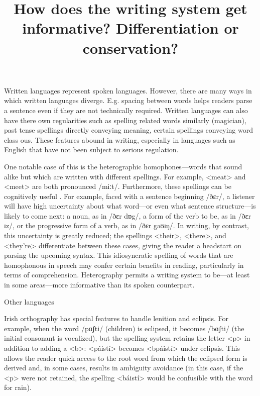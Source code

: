 \documentclass[doc,biblatex]{apa7}
\title{How does the writing system get informative? Differentiation or conservation?}
\begin{document}
\maketitle

\noindent
Written languages represent spoken languages. However, there are many ways in which written languages diverge. E.g. spacing between words helps readers parse a sentence even if they are not technically required. Written languages can also have there own regularities such as spelling related words similarly (magician), past tense spellings directly conveying meaning, certain spellings conveying word class ous. These features abound in writing, especially in languages such as English that have not been subject to serious regulation.

One notable case of this is the heterographic homophones---words that sound alike but which are written with different spellings. For example, <meat> and <meet> are both pronounced /miːt/. Furthermore, these spellings can be cognitively useful . For example, faced with a sentence beginning /ðɛr/, a listener will have high uncertainty about what word---or even what sentence structure---is likely to come next: a noun, as in /ðɛr dɒg/, a form of the verb to be, as in /ðɛr ɪz/, or the progressive form of a verb, as in /ðɛr gəʊɪŋ/. In writing, by contrast, this uncertainty is greatly reduced; the spellings <their>, <there>, and <they're> differentiate between these cases, giving the reader a headstart on parsing the upcoming syntax. This idiosyncratic spelling of words that are homophonous in speech may confer certain benefits in reading, particularly in terms of comprehension. Heterography permits a writing system to be---at least in some areas---more informative than its spoken counterpart.

Other languages

Irish orthography has special features to handle lenition and eclipsis. For example, when the word /pɑʃti/ (children) is eclipsed, it becomes /bɑʃti/ (the initial consonant is vocalized), but the spelling system retains the letter <p> in addition to adding a <b>: <páistí> becomes <bpáistí> under eclipsis. This allows the reader quick access to the root word from which the eclipsed form is derived and, in some cases, results in ambiguity avoidance (in this case, if the <p> were not retained, the spelling <báistí> would be confusible with the word for rain).
\end{document}
